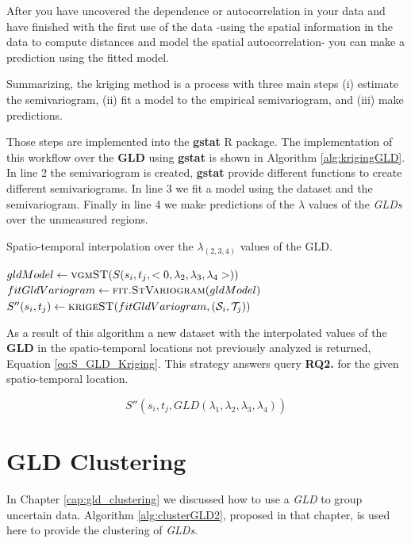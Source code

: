 After you have uncovered the dependence or autocorrelation in your data and have finished with the first use of the data -using the spatial information in the data to compute distances and model the spatial autocorrelation- you can make a prediction using the fitted model. 

Summarizing, the kriging method is a process with three main steps (i) estimate the semivariogram, (ii) fit a model to the empirical semivariogram, and (iii) make predictions.

Those steps are implemented into the \textbf{gstat} R package. The implementation of this workflow over the \textbf{GLD} using \textbf{gstat} is shown in Algorithm \ref{alg:krigingGLD}. In line 2 the semivariogram is created, \textbf{gstat} provide different functions to create different semivariograms. In line 3 we fit a model using the dataset and the semivariogram. Finally in line 4 we make predictions of the $\lambda$ values of the \textit{GLDs} over the unmeasured regions.

\begin{algorithm} 
\caption{Spatio-temporal interpolation over the $\lambda_{(2,3,4)}$ values of the GLD.}\label{alg:krigingGLD}
\begin{algorithmic}[1] 
\State $gldModel \gets \Call {vgmST}{S(s_{i},t_{j},<0,\lambda_{2},\lambda_{3},\lambda_{4}>)}$
\State $fitGldVariogram \gets \Call {fit.StVariogram}{gldModel}$
\State $S''(s_{i},t_{j}) \gets \Call {krigeST}{fitGldVariogram, (\mathcal{S}_{i}, \mathcal{T}_{j})}$
\EndFunction 
\end{algorithmic} 
\end{algorithm} 

As a result of this algorithm a new dataset with the interpolated values of the \textbf{GLD} in the spatio-temporal locations not previously analyzed is returned, Equation \ref{eq:S_GLD_Kriging}. This strategy answers query \textbf{RQ2.} for the given spatio-temporal location.

\begin{equation}\label{eq:S_GLD_Kriging}
S''(s_{i},t_{j},GLD(\lambda_{1}, \lambda_{2}, \lambda_{3}, \lambda_{4}))
\end{equation}


\section{GLD Clustering}\label{sec:clustering}
In Chapter \ref{cap:gld_clustering} we discussed how to use a \textit{GLD} to group uncertain data. Algorithm \ref{alg:clusterGLD2}, proposed in that chapter, is used here to provide the clustering of \textit{GLDs}.

